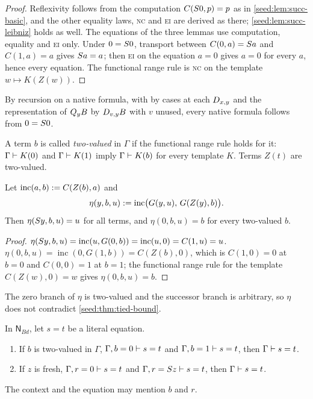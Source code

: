 \begin{proof}
Reflexivity follows from the computation $C(S 0,p)=p$ as in
\cref{seed:lem:succ-basic}, and the other equality laws, \textsc{nc} and
\textsc{ei} are derived as there; \cref{seed:lem:succ-leibniz} holds as
well. The equations of the three lemmas use computation, equality and
\textsc{ei} only. Under $0=S 0$, transport between $C(0,a)=S a$ and
$C(1,a)=a$ gives $S a=a$; then \textsc{ei} on the equation $a=0$ gives
$a=0$ for every $a$, hence every equation. The functional range rule is
\textsc{nc} on the template $w\mapsto K(Z(w))$.
\end{proof}

By recursion on a native formula, with  by cases at each
$D_{x,y}$ and the representation of $Q_{y}B$ by $D_{v,y}B$ with $v$ unused,
every native formula follows from $0=S 0$.

A term $b$ is called \emph{two-valued} in $\Gamma$ if the functional range
rule holds for it: $\Gamma\vdash K(0)$ and $\Gamma\vdash K(1)$ imply
$\Gamma\vdash K(b)$ for every template $K$. Terms $Z(t)$ are two-valued.

\begin{lemma}\label{seed:lem:nbd-sel}
Let $\operatorname{inc}(a,b)\mathrel{:=} C(Z(b),a)$ and
\[
 \eta(y,b,u)\mathrel{:=}\operatorname{inc}\bigl(G(y,u),\,G(Z(y),b)\bigr).
\]
Then $\eta(S y,b,u)=u$ for all terms, and $\eta(0,b,u)=b$ for every
two-valued $b$.
\end{lemma}

\begin{proof}
$\eta(S y,b,u)=\operatorname{inc}(u,G(0,b))=\operatorname{inc}(u,0)
=C(1,u)=u$. $\eta(0,b,u)=\operatorname{inc}(0,G(1,b))=C(Z(b),0)$, which is
$C(1,0)=0$ at $b=0$ and $C(0,0)=1$ at $b=1$; the functional range rule for
the template $C(Z(w),0)=w$ gives $\eta(0,b,u)=b$.
\end{proof}

The zero branch of $\eta$ is two-valued and the successor branch is
arbitrary, so $\eta$ does not contradict \cref{seed:thm:tied-bound}.

\begin{lemma}\label{seed:lem:nbd-cases}
In $\mathsf{N}_{Bd}$, let $s=t$ be a literal equation.
\begin{enumerate}[label=(\alph*),nosep]
\item If $b$ is two-valued in $\Gamma$, $\Gamma,b=0\vdash s=t$ and
$\Gamma,b=1\vdash s=t$, then $\Gamma\vdash s=t$.
\item If $z$ is fresh, $\Gamma,r=0\vdash s=t$ and
$\Gamma,r=S z\vdash s=t$, then $\Gamma\vdash s=t$.
\end{enumerate}
The context and the equation may mention $b$ and $r$.
\end{lemma}

